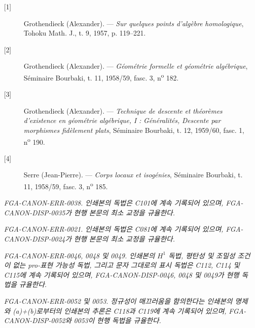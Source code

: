 \begin{description}
  \item[{[1]}] Grothendieck (Alexander). --- \emph{Sur quelques points
    d'algèbre homologique}, Tohoku Math. J., t. 9, 1957, p. 119--221.
  \item[{[2]}] Grothendieck (Alexander). --- \emph{Géométrie formelle et
    géométrie algébrique}, Séminaire Bourbaki, t. 11, 1958/59, fasc. 3,
    n\textsuperscript{o} 182.
  \item[{[3]}] Grothendieck (Alexander). --- \emph{Technique de descente et
    théorèmes d'existence en géométrie algébrique, I : Généralités, Descente
    par morphismes fidèlement plats}, Séminaire Bourbaki, t. 12, 1959/60,
    fasc. 1, n\textsuperscript{o} 190.
  \item[{[4]}] Serre (Jean-Pierre). --- \emph{Corps locaux et isogénies},
    Séminaire Bourbaki, t. 11, 1958/59, fasc. 3, n\textsuperscript{o} 185.
\end{description}

\par\smallskip
\begingroup\footnotesize
\noindent\textit{FGA-CANON-ERR-0038. 인쇄본의 독법은 C101에 계속 기록되어 있으며, FGA-CANON-DISP-0035가 현행 본문의 최소 교정을 규율한다.}\par
\noindent\textit{FGA-CANON-ERR-0021. 인쇄본의 독법은 C081에 계속 기록되어 있으며, FGA-CANON-DISP-0024가 현행 본문의 최소 교정을 규율한다.}\par
\noindent\textit{FGA-CANON-ERR-0046, 0048 및 0049. 인쇄본의 $H^1$ 독법, 평탄성 및 조밀성 조건이 없는 pro-표현 가능성 독법, 그리고 문자 그대로의 표시 독법은 C112, C114 및 C115에 계속 기록되어 있으며, FGA-CANON-DISP-0046, 0048 및 0049가 현행 독법을 규율한다.}\par
\noindent\textit{FGA-CANON-ERR-0052 및 0053. 정규성이 매끄러움을 함의한다는 인쇄본의 명제와 (a)+(b)로부터의 인쇄본의 추론은 C118과 C119에 계속 기록되어 있으며, FGA-CANON-DISP-0052와 0053이 현행 독법을 규율한다.}\par
\endgroup
